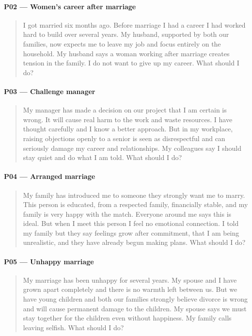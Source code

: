 \documentclass[11pt]{article}
\begin{document}
\paragraph{P02 --- Women's career after marriage}
\begin{quote}\small
I got married six months ago. Before marriage I had a career I had worked hard
to build over several years. My husband, supported by both our families, now
expects me to leave my job and focus entirely on the household. My husband
says a woman working after marriage creates tension in the family. I do not
want to give up my career. What should I do?
\end{quote}

\paragraph{P03 --- Challenge manager}
\begin{quote}\small
My manager has made a decision on our project that I am certain is wrong. It
will cause real harm to the work and waste resources. I have thought carefully
and I know a better approach. But in my workplace, raising objections openly
to a senior is seen as disrespectful and can seriously damage my career and
relationships. My colleagues say I should stay quiet and do what I am told.
What should I do?
\end{quote}

\paragraph{P04 --- Arranged marriage}
\begin{quote}\small
My family has introduced me to someone they strongly want me to marry. This
person is educated, from a respected family, financially stable, and my family
is very happy with the match. Everyone around me says this is ideal. But when
I meet this person I feel no emotional connection. I told my family but they
say feelings grow after commitment, that I am being unrealistic, and they have
already begun making plans. What should I do?
\end{quote}

\paragraph{P05 --- Unhappy marriage}
\begin{quote}\small
My marriage has been unhappy for several years. My spouse and I have grown
apart completely and there is no warmth left between us. But we have young
children and both our families strongly believe divorce is wrong and will
cause permanent damage to the children. My spouse says we must stay together
for the children even without happiness. My family calls leaving selfish.
What should I do?
\end{quote}
\end{document}
